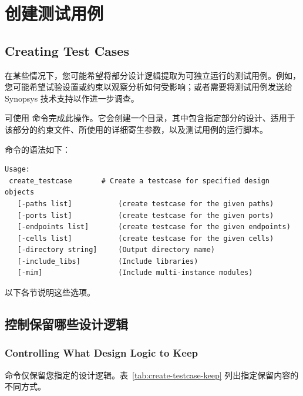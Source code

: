 \section{创建测试用例}
\subsection*{Creating Test Cases}

在某些情况下，您可能希望将部分设计逻辑提取为可独立运行的测试用例。例如，您可能希望试验设置或约束以观察分析如何受影响；或者需要将测试用例发送给 Synopsys 技术支持以作进一步调查。

可使用  命令完成此操作。它会创建一个目录，其中包含指定部分的设计、适用于该部分的约束文件、所使用的详细寄生参数，以及测试用例的运行脚本。

 命令的语法如下：
\begin{lstlisting}
Usage:
 create_testcase       # Create a testcase for specified design objects
   [-paths list]           (create testcase for the given paths)
   [-ports list]           (create testcase for the given ports)
   [-endpoints list]       (create testcase for the given endpoints)
   [-cells list]           (create testcase for the given cells)
   [-directory string]     (Output directory name)
   [-include_libs]         (Include libraries)
   [-mim]                  (Include multi-instance modules)
\end{lstlisting}

以下各节说明这些选项。

\subsection{控制保留哪些设计逻辑}
\subsubsection*{Controlling What Design Logic to Keep}

 命令仅保留您指定的设计逻辑。表~\ref{tab:create-testcase-keep} 列出指定保留内容的不同方式。

